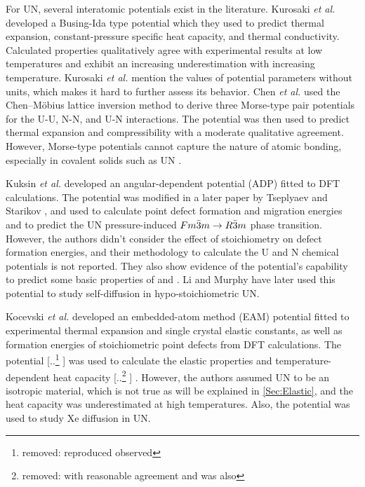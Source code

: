 \documentclass[preprint, 12pt]{elsarticle}
\providecommand{\DIFaddtex}[1]{{\protect\color{blue} \sf #1}} %
\providecommand{\DIFdeltex}[1]{{\protect\color{red} [..\footnote{removed: #1} ]}} %
\providecommand{\DIFaddbegin}{} %
\providecommand{\DIFaddend}{} %
\providecommand{\DIFdelbegin}{} %
\providecommand{\DIFdelend}{} %
\providecommand{\DIFadd}[1]{\texorpdfstring{\DIFaddtex{#1}}{#1}} %
\providecommand{\DIFdel}[1]{\texorpdfstring{\DIFdeltex{#1}}{}} %
\newcommand{\DIFscaledelfig}{0.5}
\newlength{\DIFdelgraphicswidth} %
\newlength{\DIFdelgraphicsheight} %
\newcommand{\DIFaddincludegraphics}[2][]{{\color{blue}\fbox{\DIFOincludegraphics[#1]{#2}}}} %
\newcommand{\DIFdelincludegraphics}[2][]{%
\sbox{\DIFdelgraphicsbox}{\DIFOincludegraphics[#1]{#2}}%
\settoboxwidth{\DIFdelgraphicswidth}{\DIFdelgraphicsbox} %
\settoboxtotalheight{\DIFdelgraphicsheight}{\DIFdelgraphicsbox} %
\scalebox{\DIFscaledelfig}{%
\parbox[b]{\DIFdelgraphicswidth}{\usebox{\DIFdelgraphicsbox}\\[-\baselineskip] \rule{\DIFdelgraphicswidth}{0em}}\llap{\resizebox{\DIFdelgraphicswidth}{\DIFdelgraphicsheight}{%
\setlength{\unitlength}{\DIFdelgraphicswidth}%
\begin{picture}(1,1)%
\thicklines\linethickness{2pt} %
{\color[rgb]{1,0,0}\put(0,0){\framebox(1,1){}}}%
{\color[rgb]{1,0,0}\put(0,0){\line( 1,1){1}}}%
{\color[rgb]{1,0,0}\put(0,1){\line(1,-1){1}}}%
\end{picture}%
}\hspace*{3pt}}} %
} %
\DeclareRobustCommand{\DIFaddbegin}{\DIFOaddbegin \let\includegraphics\DIFaddincludegraphics} %
\DeclareRobustCommand{\DIFaddend}{\DIFOaddend \let\includegraphics\DIFOincludegraphics} %
\DeclareRobustCommand{\DIFdelbegin}{\DIFOdelbegin \let\includegraphics\DIFdelincludegraphics} %
\DeclareRobustCommand{\DIFdelend}{\DIFOaddend \let\includegraphics\DIFOincludegraphics} %
\begin{document}
For UN, several interatomic potentials exist in the literature. Kurosaki \textit{et al.} \cite{Kurosaki2000I, Kurosaki2000II} developed a Busing-Ida type potential which they used to predict thermal expansion, constant-pressure specific heat capacity, and thermal conductivity. Calculated properties qualitatively agree with experimental results at low temperatures and exhibit an increasing underestimation with increasing temperature. Kurosaki \textit{et al.} mention the values of potential parameters without units, which makes it hard to further assess its behavior. Chen \textit{et al.} \cite{Chen2010} used the Chen–Möbius lattice inversion method to derive three Morse-type pair potentials for the U-U, N-N, and U-N interactions. The potential was then used to predict thermal expansion and compressibility with a moderate qualitative agreement. However, Morse-type potentials cannot capture the nature of atomic bonding, especially in covalent solids such as UN \cite{Mishin2005}.

Kuksin \textit{et al.} \cite{Kuksin2016} developed an angular-dependent potential (ADP) fitted to DFT calculations. The potential was modified in a later paper by Tseplyaev and Starikov \cite{Tseplyaev2016}, and used to calculate point defect formation and migration energies and to predict the UN pressure-induced $Fm\Bar{3}m \rightarrow R\Bar{3}m$ phase transition. However, the authors didn't consider the effect of stoichiometry on defect formation energies, and their methodology to calculate the U and N chemical potentials is not reported. They also show evidence of the potential's capability to predict some basic properties of  and . Li and Murphy \cite{Li2021} have later used this potential to study self-diffusion in hypo-stoichiometric UN.

Kocevski \textit{et al.} \cite{Kocevski2022II} developed an embedded-atom method (EAM) potential fitted to experimental thermal expansion and single crystal elastic constants, as well as formation energies of stoichiometric point defects from DFT calculations. The potential \DIFdelbegin \DIFdel{reproduced observed }\DIFdelend \DIFaddbegin \DIFadd{was used to calculate the }\DIFaddend elastic properties and temperature-dependent heat capacity\DIFdelbegin \DIFdel{with reasonable agreement and was also }\DIFdelend \DIFaddbegin \DIFadd{. However, the authors assumed UN to be an isotropic material, which is not true as will be explained in \ref{Sec:Elastic}, and the heat capacity was underestimated at high temperatures. Also, the potential was }\DIFaddend used to study Xe diffusion in UN.
\end{document}
